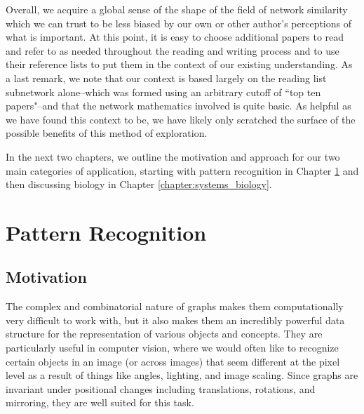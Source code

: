 \documentclass[12pt]{thesis}
\theoremstyle{plain}
\theoremstyle{definition}
\theoremstyle{remark}
\begin{document}
Overall, we acquire a global sense of the shape of the field of network similarity which we can trust to be less biased by our own or other author's perceptions of what is important. At this point, it is easy to choose additional papers to read and refer to as needed throughout the reading and writing process and to use their reference lists to put them in the context of our existing understanding. As a last remark, we note that our context is based largely on the reading list subnetwork alone--which was formed using an arbitrary cutoff of ``top ten papers"--and that the network mathematics involved is quite basic. As helpful as we have found this context to be, we have likely only scratched the surface of the possible benefits of this method of exploration.

In the next two chapters, we outline the motivation and approach for our two main categories of application, starting with pattern recognition in Chapter \ref{chapter:pattern_recognition} and then discussing biology in Chapter \ref{chapter:systems_biology}.















\chapter{Pattern Recognition}\label{chapter:pattern_recognition}
 
\section{Motivation}

The complex and combinatorial nature of graphs makes them computationally very difficult to work with, but it also makes them an incredibly powerful data structure for the representation of various objects and concepts. They are particularly useful in computer vision, where we would often like to recognize certain objects in an image (or across images) that seem different at the pixel level as a result of things like angles, lighting, and image scaling. Since graphs are invariant under positional changes including translations, rotations, and mirroring, they are well suited for this task.
\end{document}
